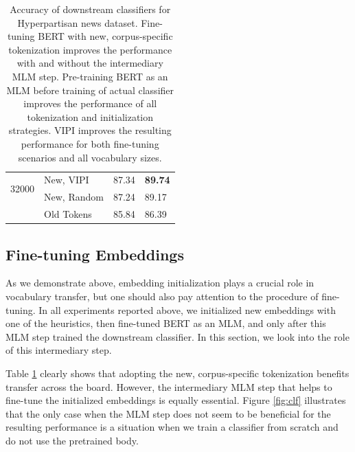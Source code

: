 \documentclass[review]{elsarticle}
\begin{document}
\begin{table}[h]
\begin{tabular}{llll}
\multirow{2}{3pt}{32000}                                                     & New, VIPI                     & 87.34                                                                                               & \textbf{89.74}                                                                                                \\
                                                                            & New, Random                   & 87.24                                                                                               & 89.17                                                                                                         \\ \cline{2-4} 
                                                                            & Old Tokens                    & 85.84                                                                                               & 86.39                                                                                                         \\ \hline
\end{tabular}
\caption{Accuracy of downstream classifiers for Hyperpartisan news dataset. Fine-tuning BERT with new, corpus-specific tokenization improves the performance with and without the intermediary MLM step. Pre-training BERT as an MLM before training of actual classifier improves the performance of all tokenization and initialization strategies. VIPI improves the resulting performance for both fine-tuning scenarios and all vocabulary sizes.}
\label{tab:Hmlmclf}
\end{table}


\subsection{Fine-tuning Embeddings} \label{sec:ftemb}

As we demonstrate above, embedding initialization plays a crucial role in vocabulary transfer, but one should also pay attention to the procedure of fine-tuning. In all experiments reported above, we initialized new embeddings with one of the heuristics, then fine-tuned BERT as an MLM, and only after this MLM step trained the downstream classifier. In this section, we look into the role of this intermediary step.

Table \ref{tab:Hmlmclf} clearly shows that adopting the new, corpus-specific tokenization benefits transfer across the board. However, the intermediary MLM step that helps to fine-tune the initialized embeddings is equally essential. Figure \ref{fig:clf} illustrates that the only case when the MLM step does not seem to be beneficial for the resulting performance is a situation when we train a classifier from scratch and do not use the pretrained body.
\end{document}
